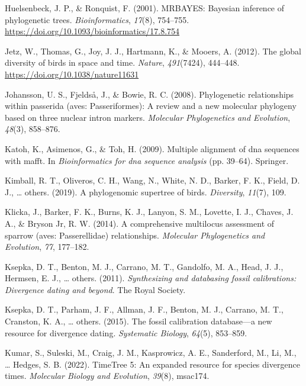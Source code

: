 \documentclass[english,man]{apa6}
\begin{document}
\leavevmode\hypertarget{ref-Huelsenbeck2001}{}%
Huelsenbeck, J. P., \& Ronquist, F. (2001). MRBAYES: Bayesian inference of phylogenetic trees. \emph{Bioinformatics}, \emph{17}(8), 754--755. \url{https://doi.org/10.1093/bioinformatics/17.8.754}

\leavevmode\hypertarget{ref-Jetz2012}{}%
Jetz, W., Thomas, G., Joy, J. J., Hartmann, K., \& Mooers, A. (2012). The global diversity of birds in space and time. \emph{Nature}, \emph{491}(7424), 444--448. \url{https://doi.org/10.1038/nature11631}

\leavevmode\hypertarget{ref-johansson2008phylogenetic}{}%
Johansson, U. S., Fjeldså, J., \& Bowie, R. C. (2008). Phylogenetic relationships within passerida (aves: Passeriformes): A review and a new molecular phylogeny based on three nuclear intron markers. \emph{Molecular Phylogenetics and Evolution}, \emph{48}(3), 858--876.

\leavevmode\hypertarget{ref-katoh2009multiple}{}%
Katoh, K., Asimenos, G., \& Toh, H. (2009). Multiple alignment of dna sequences with mafft. In \emph{Bioinformatics for dna sequence analysis} (pp. 39--64). Springer.

\leavevmode\hypertarget{ref-kimball2019phylogenomic}{}%
Kimball, R. T., Oliveros, C. H., Wang, N., White, N. D., Barker, F. K., Field, D. J., \ldots{} others. (2019). A phylogenomic supertree of birds. \emph{Diversity}, \emph{11}(7), 109.

\leavevmode\hypertarget{ref-klicka2014comprehensive}{}%
Klicka, J., Barker, F. K., Burns, K. J., Lanyon, S. M., Lovette, I. J., Chaves, J. A., \& Bryson Jr, R. W. (2014). A comprehensive multilocus assessment of sparrow (aves: Passerellidae) relationships. \emph{Molecular Phylogenetics and Evolution}, \emph{77}, 177--182.

\leavevmode\hypertarget{ref-ksepka2011synthesizing}{}%
Ksepka, D. T., Benton, M. J., Carrano, M. T., Gandolfo, M. A., Head, J. J., Hermsen, E. J., \ldots{} others. (2011). \emph{Synthesizing and databasing fossil calibrations: Divergence dating and beyond}. The Royal Society.

\leavevmode\hypertarget{ref-ksepka2015fossil}{}%
Ksepka, D. T., Parham, J. F., Allman, J. F., Benton, M. J., Carrano, M. T., Cranston, K. A., \ldots{} others. (2015). The fossil calibration database---a new resource for divergence dating. \emph{Systematic Biology}, \emph{64}(5), 853--859.

\leavevmode\hypertarget{ref-kumar2022timetree}{}%
Kumar, S., Suleski, M., Craig, J. M., Kasprowicz, A. E., Sanderford, M., Li, M., \ldots{} Hedges, S. B. (2022). TimeTree 5: An expanded resource for species divergence times. \emph{Molecular Biology and Evolution}, \emph{39}(8), msac174.
\end{document}
